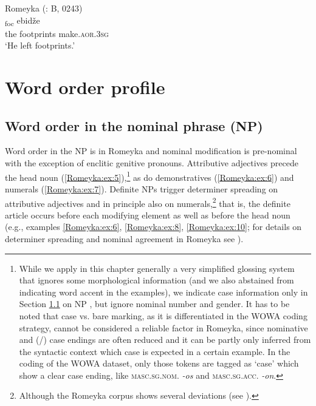 \documentclass[output=paper,colorlinks,citecolor=brown]{langscibook}
\begin{document}
\ea\label{Romeyka:ex:4}
Romeyka (\citealt{schreiber2021pontic}: B, 0243) \\
\gll [ta is]\textsubscript{foc} ebidže \\
the footprints make\textsc{.aor.3sg} \\
\glt `He left footprints.'  \\
\z

\section{Word order profile}\label{Romeyka:ss:4}

\subsection{Word order in the nominal phrase (NP)}\label{Romeyka:ss:4.1}

Word order in the NP is  in Romeyka and nominal modification is pre-nominal with the exception of enclitic genitive pronouns. Attributive adjectives precede the head noun (\ref{Romeyka:ex:5}),\footnote{While we apply in this chapter generally a very simplified glossing system that ignores some morphological information (and we also abstained from indicating word accent in the examples), we indicate case information only in Section \ref{Romeyka:ss:4.1} on NP , but ignore nominal number and gender. It has to be noted that case  vs. bare marking, as it is differentiated in the WOWA coding strategy, cannot be considered a reliable factor in Romeyka, since nominative and (/) case endings are often reduced and it can be partly only inferred from the syntactic context which case is expected in a certain example. In the coding of the WOWA dataset, only those tokens are tagged as `case' which show a clear case ending, like \textsc{masc.sg.nom}. \textit{-os} and \textsc{masc.sg.acc}. \textit{-on}.} as do demonstratives (\ref{Romeyka:ex:6}) and numerals (\ref{Romeyka:ex:7}). Definite NPs trigger determiner spreading on attributive adjectives and in principle also on numerals,\footnote{Although the Romeyka corpus shows several deviations (see \citealt{schreibergrammar2022}).} that is, the definite article occurs before each modifying element as well as before the head noun (e.g., examples \ref{Romeyka:ex:6}, \ref{Romeyka:ex:8}, \ref{Romeyka:ex:10}; for details on determiner spreading and nominal agreement in Romeyka see \citealt{schreibergrammar2022}).
\end{document}
